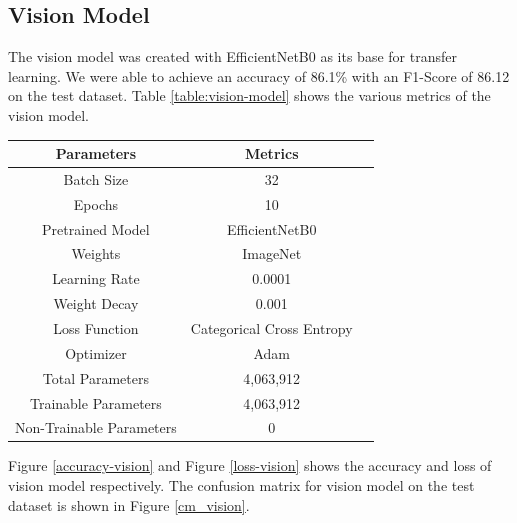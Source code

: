 \documentclass[fleqn, 10pt, twoside]{IOEGC}
\begin{document}
\subsection{Vision Model}
The vision model was created with EfficientNetB0 as its base for transfer learning. We were able to achieve an accuracy of 86.1\% with an F1-Score of 86.12 on the test dataset. Table \ref{table:vision-model} shows the various metrics of the vision model.
\begin{center}
	\begin{tabular}{ |c|c|c| }
		\hline
		\textbf{Parameters}      & \textbf{Metrics}          \\
		\hline
		Batch Size               & 32                        \\
		\hline
		Epochs                   & 10                        \\
		\hline
		Pretrained Model         & EfficientNetB0            \\
		\hline
		Weights                  & ImageNet                  \\
		\hline
		Learning Rate            & 0.0001                    \\
		\hline
		Weight Decay             & 0.001                     \\
		\hline
		Loss Function            & Categorical Cross Entropy \\
		\hline
		Optimizer                & Adam                      \\
		\hline
		Total Parameters         & 4,063,912                 \\
		\hline
		Trainable Parameters     & 4,063,912                 \\
		\hline
		Non-Trainable Parameters & 0                         \\
		\hline
	\end{tabular}
	\label{table:vision-model}

\end{center}

Figure \ref{accuracy-vision} and Figure \ref{loss-vision} shows the accuracy and loss of vision model respectively. The confusion matrix for vision model on the test dataset is shown in Figure \ref{cm_vision}.
\end{document}
